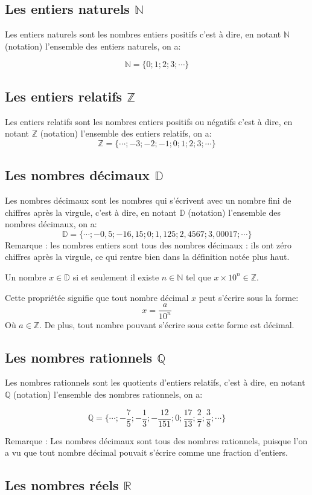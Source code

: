 \documentclass[10pt,a4paper,oneside]{book}
\newcommand{\N}{\mathbb{N}}
\newcommand{\Z}{\mathbb{Z}}
\newcommand{\D}{\mathbb{D}}
\newcommand{\Q}{\mathbb{Q}}
\newcommand{\R}{\mathbb{R}}
\begin{document}
\subsection{Les entiers naturels $\N$}
Les entiers naturels sont les nombres entiers positifs c'est à dire, en notant $\N$ 
(notation) l'ensemble des entiers naturels, on a:

$$\N=\{0;1;2;3;\cdots\}$$
\subsection{Les entiers relatifs $\Z$}
Les entiers relatifs sont les nombres entiers positifs ou négatifs c'est à dire, en notant $\Z$ 
(notation) l'ensemble des entiers relatifs, on a:
$$\Z=\{\cdots;-3;-2;-1;0;1;2;3;\cdots\}$$

\subsection{Les nombres décimaux $\D$}
Les nombres décimaux sont les nombres qui s'écrivent avec un nombre fini de chiffres après la virgule,
 c'est à dire, en notant $\D$ 
(notation) l'ensemble des nombres décimaux, on a:
$$\D=\{\cdots;-0{,}5;-16{,}15;0;1{,}125;2{,}4567;3{,}00017;\cdots\}$$
Remarque : les nombres entiers sont tous des nombres décimaux : ils ont zéro chiffres après la virgule, ce qui rentre bien dans la définition notée plus haut.
\begin{prop}
  Un nombre $x\in\D$ si et seulement il existe $n\in\N$ tel que $x\times 10^{n}\in\Z$.
\end{prop}
Cette propriétée signifie que tout nombre décimal $x$ peut s'écrire sous la forme: 
$$x=\frac{a}{10^{n}}$$
Où $a\in\Z$. De plus, tout nombre pouvant s'écrire sous cette forme est décimal.

\subsection{Les nombres rationnels $\Q$}
Les nombres rationnels sont les quotients d'entiers relatifs, c'est à dire, en notant $\Q$ 
(notation) l'ensemble des nombres rationnels, on a:


$$\Q=\{\cdots;-\frac{7}{5};-\frac{1}{3};-\frac{12}{151};0;\frac{17}{13};\frac{2}{7};\frac{3}{8};\cdots\}$$

Remarque : Les nombres décimaux sont tous des nombres rationnels, puisque l'on a vu que tout nombre décimal pouvait s'écrire comme une fraction d'entiers.

\subsection{Les nombres réels $\R$}
\end{document}
